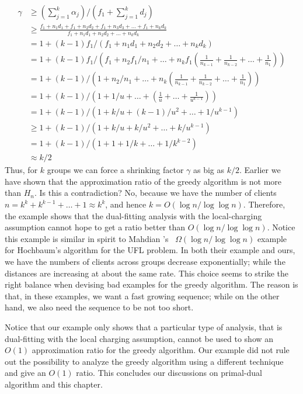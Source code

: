 \documentclass[oneside,final]{ucr}
\def\dsp{\def\baselinestretch{2.0}\large\normalsize}
\def\ssp{\def\baselinestretch{1.0}\large\normalsize}
\begin{document}
\ssp
\begin{align*}
  \gamma &\geq (\sum_{j=1}^k \alpha_j) / (f_1 + \sum_{j=1}^k d_j)\\
  &\geq \frac{f_1 + n_1 d_1 + f_1 + n_2 d_2 + f_1 + n_3 d_3 + \ldots +
    f_1 + n_k
    d_k}{f_1 + n_1 d_1 + n_2 d_2 + \ldots + n_k d_k}\\
  &= 1 + (k-1)f_1 / (f_1 + n_1 d_1 + n_2 d_2 + \ldots + n_k d_k)\\
  &= 1 + (k-1)f_1 / \left(f_1 + n_2 f_1 / n_1 + \ldots + n_k f_1
    (\frac{1}{n_{k-1}} + \frac{1}{n_{k-2}} + \ldots +
    \frac{1}{n_1})\right)\\
  &= 1 + (k-1) / \left(1 + n_2 / n_1 + \ldots + n_k
    (\frac{1}{n_{k-1}} + \frac{1}{n_{k-2}} + \ldots +
    \frac{1}{n_1})\right)\\
  &= 1 + (k-1) / \left(1 + 1/u + \ldots + (\frac{1}{u} + \ldots +
    \frac{1}{u^{k-1}})\right)\\
  &= 1 + (k-1) / \left(1 + k/u + (k-1)/u^2 + \ldots +
    1/u^{k-1}\right)\\
  &\geq 1 + (k-1) / \left(1 + k/u + k/u^2 + \ldots +
    k/u^{k-1}\right)\\
  &= 1 + (k-1) / \left(1 + 1 + 1/k + \ldots + 1/k^{k-2}\right)\\
  &\approx k/2
\end{align*}
\dsp
Thus, for $k$ groups we can force a shrinking factor
$\gamma$ as big as $k/2$. Earlier we have shown that the
approximation ratio of the greedy algorithm is not more than
$H_n$. Is this a contradiction? No, because we have the
number of clients $n=k^k + k^{k-1} + \ldots + 1 \approx
k^k$, and hence $k = O(\log n / \log\log n)$. Therefore, the
example shows that the dual-fitting analysis with the
local-charging assumption cannot hope to get a ratio better
than $O(\log n / \log\log n)$. Notice this example is
similar in spirit to Mahdian {\etal}'s~\cite{JainMMSV03}
$\Omega(\log n/ \log\log n)$ example for Hochbaum's
algorithm for the UFL problem. In both their example and
ours, we have the numbers of clients across groups decrease
exponentially; while the distances are increasing at about
the same rate. This choice seems to strike the right balance
when devising bad examples for the greedy algorithm. The
reason is that, in these examples, we want a fast growing
sequence; while on the other hand, we also need the sequence
to be not too short.  

Notice that our example only shows that a particular type of
analysis, that is dual-fitting with the local charging
assumption, cannot be used to show an $O(1)$ approximation
ratio for the greedy algorithm. Our example did not rule out
the possibility to analyze the greedy algorithm using a
different technique and give an $O(1)$ ratio. This concludes
our discussions on primal-dual algorithm and this chapter.
\end{document}
